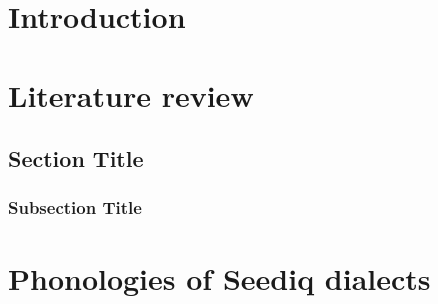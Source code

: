 \documentclass[master]{NTHUthesis}
\begin{document}
\makecover


\begin{abstractEN}
\lipsum[1-2]
\end{abstractEN}

\begin{abstractSED}
\lipsum[1-2]
\end{abstractSED}

\begin{abstractZH}
\zhlipsum[1-2]
\end{abstractZH}

\begin{acknowledgementsEN}
\lipsum[1-2]
\end{acknowledgementsEN}

\maketoc

\listofalgorithms
{}
\clearpage



\chapter{Introduction}
\lipsum[1-3] \textcite{blust1999subgrouping} \pan

\chapter{Literature review}
\lipsum[1-3]

\section{Section Title}
\lipsum[4-5]

\subsection{Subsection Title}
\lipsum[6]

\chapter{Phonologies of Seediq dialects}
\lipsum[1-3]
\end{document}
